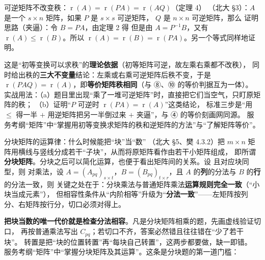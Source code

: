 \begin{fdeep}{可逆矩阵不改变秩：$\operatorname{r}(A)=\operatorname{r}(PA)=\operatorname{r}(AQ)$（定理 4）}
（北大 §3）：$A$ 是一个 $s\times n$ 矩阵，如果 $P$ 是 $s\times s$ 可逆矩阵，
$Q$ 是 $n\times n$ 可逆矩阵，那么
证明思路（夹逼）：令 $B=PA$，由定理 2 得
但是由 $A=P^{-1}B$，又有 $\operatorname{r}(A)\le\operatorname{r}(B)$。所以
$\operatorname{r}(A)=\operatorname{r}(B)=\operatorname{r}(PA)$。另一个等式同样地证明。

这是“初等变换可以求秩”的\textbf{理论依据}（初等矩阵可逆，故左乘右乘都不改秩），
同时给出秩的\textbf{三大不变量}结论：左乘或右乘可逆矩阵后秩不变，于是
$\operatorname{r}(PAQ)=\operatorname{r}(A)$，即\textbf{等价矩阵秩相同}（与 ⑧、⑩ 的等价判据互为一体）。
实战用法：（a）题目里出现“乘了一堆可逆矩阵”时，直接把它们当空气，只盯原矩阵的秩；
（b）证明“$P$ 可逆时 $\operatorname{r}(PA)=\operatorname{r}(A)$”这类结论，
标准三步是“用 $\le$ 得一半 $+$ 用逆矩阵把另一半倒过来 $+$ 夹逼”，与 ④ 的等价刻画网同源。
\fbref{}服务考纲“矩阵”中“掌握用初等变换求矩阵的秩和逆矩阵的方法”与“了解矩阵等价”。
\end{fdeep}


\begin{fdeep}{分块矩阵的运算律：什么时候能把“块”当“数”}
（北大 §5、樊 4.3.2）把 $m\times n$ 矩阵用横线与竖线分成若干“子块”，从而将原矩阵看作由若干小矩阵组成，
即所谓\textbf{分块矩阵}。分块之后可以简化运算，也便于看出矩阵间的关系。设
且对应块同型，则
对乘法，设 $A=(A_{pq})_{s\times t}$，$B=(B_{pq})_{t\times r}$，且 $A$ 的\textbf{列}的分法与 $B$ 的\textbf{行}的分法一致，则
关键之处在于：分块乘法与普通矩阵乘法\textbf{运算规则完全一致}（“小块当成元素”），
但相容性条件从“内阶相等”升级为“\textbf{分法一致}”——左矩阵按列分、右矩阵按行分，切口必须对得上。

\textbf{把块当数的唯一代价就是检查分法相容}。凡是分块矩阵相乘的题，先画虚线验证切口，
再按普通乘法写出 $C_{pq}$；若切口不齐，答案必然错且往往错在“少了若干块”。
转置是把“块的位置转置”再“每块自己转置”，这两步都要做，缺一即错。
\fbref{}服务考纲“矩阵”中“掌握分块矩阵及其运算”。这条是分块题的第一道门槛：
\end{fdeep}

